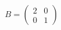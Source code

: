 \documentclass[preview]{standalone}
\begin{document}
\begin{align*}
B = \begin{pmatrix} 2 & 0 \\ 0 & 1 \end{pmatrix}
\end{align*}
\end{document}
